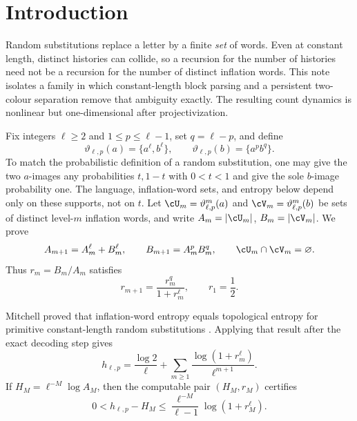\section{Introduction}
\label{sec:introduction}

Random substitutions replace a letter by a finite \emph{set} of words.
Even at constant length, distinct histories can collide, so a recursion for
the number of histories need not be a recursion for the number of distinct
inflation words.  This note isolates a family in which constant-length block
parsing and a persistent two-colour separation remove that ambiguity exactly.
The resulting count dynamics is nonlinear but one-dimensional after
projectivization.

Fix integers $\ell\ge2$ and $1\le p\le\ell-1$, set $q=\ell-p$, and define
\begin{equation}
 \vartheta_{\ell,p}(a)=\{a^\ell,b^\ell\},\qquad
 \vartheta_{\ell,p}(b)=\{a^pb^q\}.
 \label{eq:substitution}
\end{equation}
To match the probabilistic definition of a random substitution, one may give
the two $a$-images any probabilities $t,1-t$ with $0<t<1$ and give the sole
$b$-image probability one.  The language, inflation-word sets, and entropy
below depend only on these supports, not on $t$.
Let $\cU_m=\vartheta_{\ell,p}^m(a)$ and
$\cV_m=\vartheta_{\ell,p}^m(b)$ be sets of distinct level-$m$ inflation
words, and write $A_m=|\cU_m|$, $B_m=|\cV_m|$.  We prove
\begin{equation}
 A_{m+1}=A_m^\ell+B_m^\ell,\qquad
 B_{m+1}=A_m^pB_m^q,\qquad
 \cU_m\cap\cV_m=\varnothing.
 \label{eq:count-recurrence}
\end{equation}
Thus $r_m=B_m/A_m$ satisfies
\begin{equation}
 r_{m+1}=\frac{r_m^q}{1+r_m^\ell},\qquad r_1=\frac12.
 \label{eq:projective}
\end{equation}

Mitchell proved that inflation-word entropy equals topological entropy for
primitive constant-length random substitutions \cite[Theorem~4.1]{Mitchell2024}.
Applying that result after the exact decoding step gives
\begin{equation}
 h_{\ell,p}=\frac{\log2}{\ell}
 +\sum_{m\ge1}\frac{\log(1+r_m^\ell)}{\ell^{m+1}}.
 \label{eq:entropy-series}
\end{equation}
If $H_M=\ell^{-M}\log A_M$, then the computable pair $(H_M,r_M)$ certifies
\begin{equation}
 0<h_{\ell,p}-H_M
 \le \frac{\ell^{-M}}{\ell-1}\log(1+r_M^\ell).
 \label{eq:basic-tail}
\end{equation}

